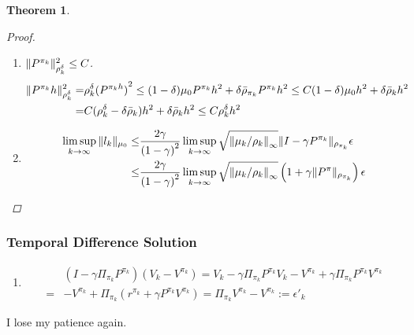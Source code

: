 \documentclass[a4paper]{article}
\newtheorem{theorem}{Theorem}
\begin{document}
\begin{theorem}
\begin{proof}
\begin{enumerate}
\begin{align*}
                    =& \frac{1 - \lambda}{\lambda} \mu_0 \left\{ \sum^{\infty}_{t=0} \lambda^t {(P^{\pi_k})}^{t} h^2 - h^2 \right\} \le \frac{1}{\lambda} \rho^{\lambda}_{k}h^2 = \frac{1}{\lambda} \Arrowvert h \Arrowvert^2_{\rho^\lambda_{k}}
                \end{align*}
            \item $ \Arrowvert P^{\pi_k} \Arrowvert^2_{\rho^{\delta}_k} \le C $.
                \begin{align*}
                    \Arrowvert P^{\pi_k} h \Arrowvert^2_{\rho^{\delta}_k}
                    =& \rho^{\delta}_{k} {(P^{\pi_k h})}^2
                    \le (1 - \delta) \mu_0 P^{\pi_k} h^2 + \delta \bar\rho_{\pi_k} P^{\pi_k}h^2
                    \le C(1 - \delta) \mu_0 h^2 + \delta \bar\rho_k h^2\\
                    =& C (\rho^{\delta} _ k - \delta \bar \rho_k) h^2 + \delta \bar\rho_k h^2
                    \le C \rho^{\delta}_{k}h^2
                \end{align*}
            \item 
                \begin{align*}
                    \limsup_{k \rightarrow\infty} \Arrowvert l_k \Arrowvert_{\mu_0}
                    \le& \frac{2\gamma}{{(1 - \gamma)}^{2}} \limsup_{k \rightarrow\infty} \sqrt {{\Arrowvert \mu_k / \rho_k \Arrowvert}_\infty} \Arrowvert I - \gamma P^{\pi_k} \Arrowvert_{\rho_{\pi_k}}\epsilon\\
                    \le&  \frac{2\gamma}{{(1 - \gamma)}^{2}} \limsup_{k \rightarrow\infty} \sqrt {{\Arrowvert \mu_k / \rho_k \Arrowvert}_\infty} \left( 1 + \gamma \Arrowvert P^{\pi} \Arrowvert_{\rho_{\pi_k}} \right)\epsilon\\
                \end{align*}
        \end{enumerate}
    \end{proof}
\end{theorem} 
\subsubsection{Temporal Difference Solution}%
\begin{enumerate}
    \item 
        \begin{align*}
            &(I - \gamma \Pi_{\pi_k} P^{\pi_k}) (V_k - V^{\pi_k}) = V_k - \gamma \Pi_{\pi_k}P^{\pi_k}V_k - V^{\pi_k} + \gamma\Pi_{\pi_k}P^{\pi_k} V^{\pi_k} \\
            =& - V^{\pi_k} + \Pi_{\pi_k}(r^{\pi_k} + \gamma P^{\pi_k} V^{\pi_k}) = \Pi_{\pi_k}V^{\pi_k} - V^{\pi_k}
            := \epsilon'_k
        \end{align*}
\end{enumerate}
I lose my patience again.
\end{document}
